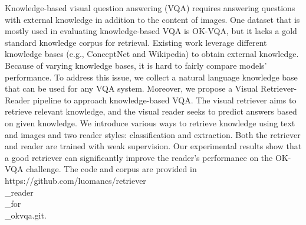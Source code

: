 Knowledge-based visual question answering (VQA) requires answering questions with external knowledge in addition to the content of images. One dataset that is mostly used in evaluating  knowledge-based VQA is OK-VQA, but it lacks a gold standard knowledge corpus for retrieval. Existing work leverage different knowledge bases (e.g., ConceptNet and Wikipedia) to obtain external knowledge. Because of varying knowledge bases, it is hard to fairly compare models' performance. To address this issue, we collect a natural language knowledge base that can be used for any VQA system. Moreover,  we propose a Visual Retriever-Reader pipeline to approach knowledge-based VQA. The visual retriever aims to retrieve relevant knowledge, and the visual reader seeks to predict answers based on given knowledge.  We introduce various ways to retrieve knowledge using text and images and two reader styles: classification and extraction. Both the retriever and reader are trained with weak supervision. Our experimental results show that a good retriever can significantly improve the reader's performance on the OK-VQA challenge. The code and corpus are provided in https://github.com/luomancs/retriever\\_reader\\_for\\_okvqa.git.
